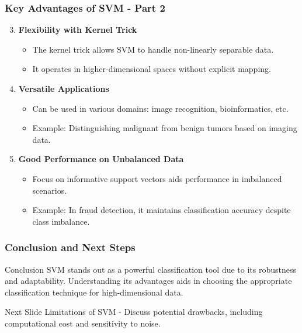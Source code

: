 \documentclass{beamer}
\begin{document}
\begin{frame}[fragile]
    \frametitle{Key Advantages of SVM - Part 2}
    \begin{enumerate}
        \setcounter{enumi}{2}
        \item \textbf{Flexibility with Kernel Trick}
        \begin{itemize}
            \item The kernel trick allows SVM to handle non-linearly separable data.
            \item It operates in higher-dimensional spaces without explicit mapping.
        \end{itemize}

        \item \textbf{Versatile Applications}
        \begin{itemize}
            \item Can be used in various domains: image recognition, bioinformatics, etc.
            \item Example: Distinguishing malignant from benign tumors based on imaging data.
        \end{itemize}

        \item \textbf{Good Performance on Unbalanced Data}
        \begin{itemize}
            \item Focus on informative support vectors aids performance in imbalanced scenarios.
            \item Example: In fraud detection, it maintains classification accuracy despite class imbalance.
        \end{itemize}
    \end{enumerate}
\end{frame}

\begin{frame}[fragile]
    \frametitle{Conclusion and Next Steps}
    \begin{block}{Conclusion}
        SVM stands out as a powerful classification tool due to its robustness and adaptability.
        Understanding its advantages aids in choosing the appropriate classification technique for high-dimensional data.
    \end{block}

    \begin{block}{Next Slide}
        Limitations of SVM - Discuss potential drawbacks, including computational cost and sensitivity to noise.
    \end{block}
\end{frame}
\end{document}
